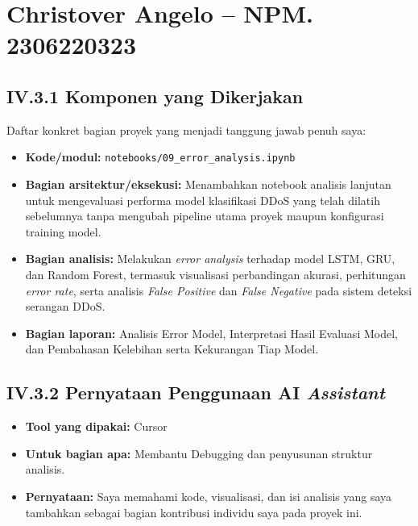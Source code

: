 \documentclass[11pt,a4paper,oneside]{report}
\begin{document}
\section{Christover Angelo -- NPM. 2306220323}

\subsection*{IV.3.1 Komponen yang Dikerjakan}
Daftar konkret bagian proyek yang menjadi tanggung jawab penuh saya:
\begin{itemize}[leftmargin=*]
    \item \textbf{Kode/modul:} \texttt{notebooks/09\_error\_analysis.ipynb}
    
    \item \textbf{Bagian arsitektur/eksekusi:} Menambahkan notebook analisis lanjutan untuk mengevaluasi performa model klasifikasi DDoS yang telah dilatih sebelumnya tanpa mengubah pipeline utama proyek maupun konfigurasi training model.
    
    \item \textbf{Bagian analisis:} Melakukan \textit{error analysis} terhadap model LSTM, GRU, dan Random Forest, termasuk visualisasi perbandingan akurasi, perhitungan \textit{error rate}, serta analisis \textit{False Positive} dan \textit{False Negative} pada sistem deteksi serangan DDoS.
    
    \item \textbf{Bagian laporan:} Analisis Error Model, Interpretasi Hasil Evaluasi Model, dan Pembahasan Kelebihan serta Kekurangan Tiap Model.
\end{itemize}

\subsection*{IV.3.2 Pernyataan Penggunaan AI \textit{Assistant}}
\begin{itemize}[leftmargin=*]
    \item \textbf{Tool yang dipakai:} Cursor
    
    \item \textbf{Untuk bagian apa:} Membantu Debugging dan penyusunan struktur analisis.
    
    \item \textbf{Pernyataan:} Saya memahami kode, visualisasi, dan isi analisis yang saya tambahkan sebagai bagian kontribusi individu saya pada proyek ini.
\end{itemize}
\end{document}
